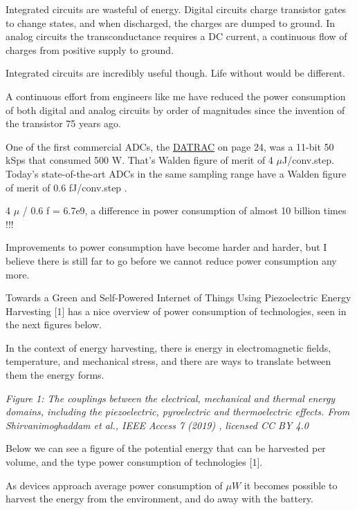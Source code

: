 Integrated circuits are wasteful of energy. Digital circuits charge
transistor gates to change states, and when discharged, the charges are
dumped to ground. In analog circuits the transconductance requires a DC
current, a continuous flow of charges from positive supply to ground.

Integrated circuits are incredibly useful though. Life without would be
different.

A continuous effort from engineers like me have reduced the power
consumption of both digital and analog circuits by order of magnitudes
since the invention of the transistor 75 years ago.

One of the first commercial ADCs, the
\href{https://www.analog.com/media/en/training-seminars/design-handbooks/Data-Conversion-Handbook/Chapter1.pdf}{DATRAC}
on page 24, was a 11-bit 50 kSps that consumed 500 W. That's Walden
figure of merit of 4 \(\mu\)J/conv.step. Today's state-of-the-art ADCs
in the same sampling range have a Walden figure of merit of 0.6
fJ/conv.step .

4 \(\mu\) / 0.6 f = 6.7e9, a difference in power consumption of almost
10 billion times !!!

Improvements to power consumption have become harder and harder, but I
believe there is still far to go before we cannot reduce power
consumption any more.

Towards a Green and Self-Powered Internet of Things Using Piezoelectric
Energy Harvesting  {[}1{]}
has a nice overview of power consumption of technologies, seen in the
next figures below.

In the context of energy harvesting, there is energy in electromagnetic
fields, temperature, and mechanical stress, and there are ways to
translate between them the energy forms.


{
\centering
{}
}

\emph{Figure 1: The couplings between the electrical, mechanical and
thermal energy domains, including the piezoelectric, pyroelectric and
thermoelectric effects. From Shirvanimoghaddam et al., \emph{IEEE
Access} 7 (2019) , licensed
CC BY 4.0}

Below we can see a figure of the potential energy that can be harvested
per volume, and the type power consumption of technologies {[}1{]}.

As devices approach average power consumption of \(\mu W\) it becomes
possible to harvest the energy from the environment, and do away with
the battery.



